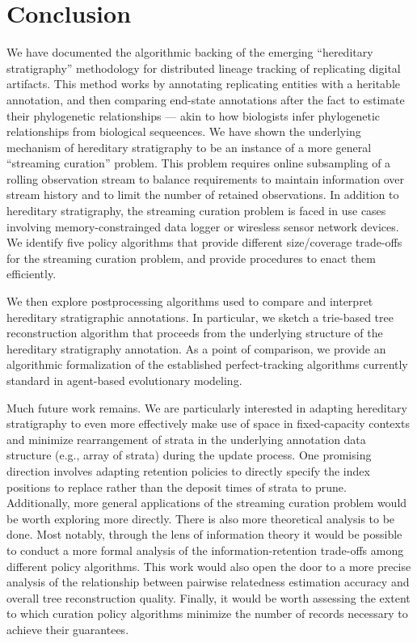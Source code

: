 \section{Conclusion} \label{sec:conclusion}

We have documented the algorithmic backing of the emerging ``hereditary stratigraphy'' methodology for distributed lineage tracking of replicating digital artifacts.
This method works by annotating replicating entities with a heritable annotation, and then comparing end-state annotations after the fact to estimate their phylogenetic relationships --- akin to how biologists infer phylogenetic relationships from biological sequeences.
We have shown the underlying mechanism of hereditary stratigraphy to be an instance of a more general ``streaming curation'' problem.
This problem requires online subsampling of a rolling observation stream to balance requirements to maintain information over stream history and to limit the number of retained observations.
In addition to hereditary stratigraphy, the streaming curation problem is faced in use cases involving memory-constrainged data logger or wiresless sensor network devices.
We identify five policy algorithms that provide different size/coverage trade-offs for the streaming curation problem, and provide procedures to enact them efficiently.

We then explore postprocessing algorithms used to compare and interpret hereditary stratigraphic annotations.
In particular, we sketch a trie-based tree reconstruction algorithm that proceeds from the underlying structure of the hereditary stratigraphy annotation.
As a point of comparison, we provide an algorithmic formalization of the established perfect-tracking algorithms currently standard in agent-based evolutionary modeling.

Much future work remains.
We are particularly interested in adapting hereditary stratigraphy to even more effectively make use of space in fixed-capacity contexts and minimize rearrangement of strata in the underlying annotation data structure (e.g., array of strata) during the update process.
One promising direction involves adapting retention policies to directly specify the index positions to replace rather than the deposit times of strata to prune.
Additionally, more general applications of the streaming curation problem would be worth exploring more directly.
There is also more theoretical analysis to be done.
Most notably, through the lens of information theory it would be possible to conduct a more formal analysis of the information-retention trade-offs among different policy algorithms. 
This work would also open the door to a more precise analysis of the relationship between pairwise relatedness estimation accuracy and overall tree reconstruction quality.
Finally, it would be worth assessing the extent to which curation policy algorithms minimize the number of records necessary to achieve their guarantees.

